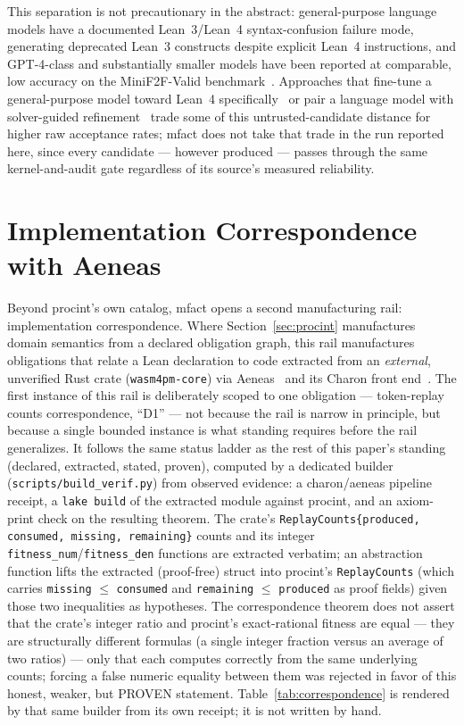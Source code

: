 \documentclass[11pt]{article}
\begin{document}
This separation is not precautionary in the abstract: general-purpose
language models have a documented Lean~3/Lean~4 syntax-confusion failure
mode, generating deprecated Lean~3 constructs despite explicit Lean~4
instructions, and GPT-4-class and substantially smaller models have been
reported at comparable, low accuracy on the MiniF2F-Valid
benchmark~\cite{langconfusion2025}. Approaches that fine-tune a
general-purpose model toward Lean~4 specifically~\cite{theoremllama2024} or
pair a language model with solver-guided refinement~\cite{apollo2025} trade
some of this untrusted-candidate distance for higher raw acceptance rates;
\textsf{mfact} does not take that trade in the run reported here, since every
candidate --- however produced --- passes through the same kernel-and-audit
gate regardless of its source's measured reliability.

\section{Implementation Correspondence with Aeneas}
\label{sec:correspondence}

Beyond \textsf{procint}'s own catalog, \textsf{mfact} opens a second
manufacturing rail: implementation correspondence. Where
Section~\ref{sec:procint} manufactures domain semantics from a declared
obligation graph, this rail manufactures obligations that relate a Lean
declaration to code extracted from an \emph{external}, unverified Rust
crate (\texttt{wasm4pm-core}) via Aeneas~\cite{ho2022aeneas} and its
Charon front end~\cite{protzenko2024charon}. The first instance of this
rail is deliberately scoped to one obligation --- token-replay counts
correspondence, ``D1'' --- not because the rail is narrow in principle,
but because a single bounded instance is what standing requires before the
rail generalizes. It follows the same status ladder as the rest of this
paper's standing (declared, extracted, stated, proven), computed by a
dedicated builder (\texttt{scripts/build\_verif.py}) from observed
evidence: a charon/aeneas pipeline receipt, a \texttt{lake build} of the
extracted module against \textsf{procint}, and an axiom-print check on the
resulting theorem. The
crate's \texttt{ReplayCounts}\allowbreak\texttt{\{produced, consumed,
missing, remaining\}} counts and its integer
\texttt{fitness\_num}/\texttt{fitness\_den} functions are extracted
verbatim; an abstraction function lifts the extracted (proof-free) struct
into \textsf{procint}'s \texttt{ReplayCounts} (which carries
\texttt{missing} $\le$ \texttt{consumed} and \texttt{remaining} $\le$
\texttt{produced} as proof fields) given those two inequalities as
hypotheses. The correspondence theorem does not assert that the crate's
integer ratio and \textsf{procint}'s exact-rational fitness are equal ---
they are structurally different formulas (a single integer fraction versus
an average of two ratios) --- only that each computes correctly from the
same underlying counts; forcing a false numeric equality between them was
rejected in favor of this honest, weaker, but PROVEN statement.
Table~\ref{tab:correspondence} is rendered by that same builder from its
own receipt; it is not written by hand.
\end{document}
